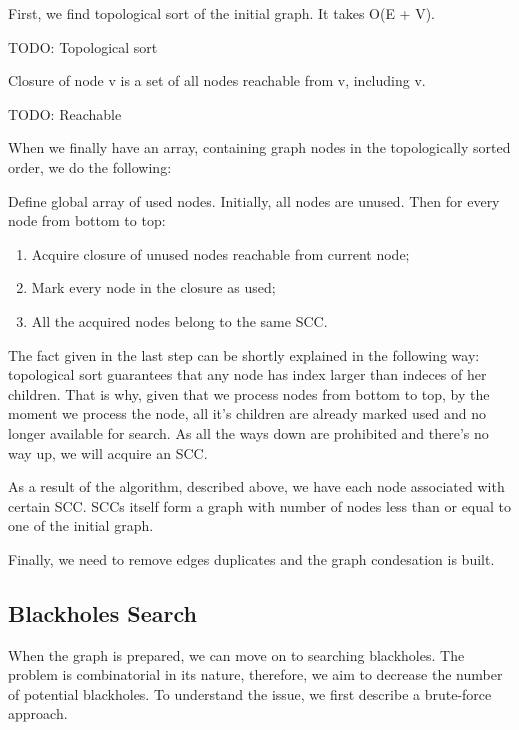 \documentclass{svproc}
\begin{document}
First, we find topological sort of the initial graph. It takes O(E + V).
\begin{definition}
TODO: Topological sort
\end{definition}

\begin{definition}
Closure of node v is a set of all nodes reachable from v, including v.
\end{definition}

\begin{definition}
TODO: Reachable
\end{definition}

When we finally have an array, containing graph nodes in the topologically sorted order, we do the following:

Define global array of used nodes. Initially, all nodes are unused.
Then for every node from bottom to top:
\begin{enumerate}
    \item Acquire closure of unused nodes reachable from current node; 
    \item Mark every node in the closure as used;
    \item All the acquired nodes belong to the same SCC.
\end{enumerate}

The fact given in the last step can be shortly explained in the following way:
topological sort guarantees that any node has index larger than indeces of her children.
That is why, given that we process nodes from bottom to top, by the moment we process the node, all it's children are already marked used and no longer available for search.
As all the ways down are prohibited and there's no way up, we will acquire an SCC.

As a result of the algorithm, described above, we have each node associated with certain SCC.
SCCs itself form a graph with number of nodes less than or equal to one of the initial graph.

Finally, we need to remove edges duplicates and the graph condesation is built. 


%

%
\subsection{Blackholes Search}
When the graph is prepared, we can move on to searching blackholes. The problem is combinatorial in its nature, therefore, we aim to
decrease the number of potential blackholes.
To understand the issue, we first describe a brute-force approach. 
\end{document}
